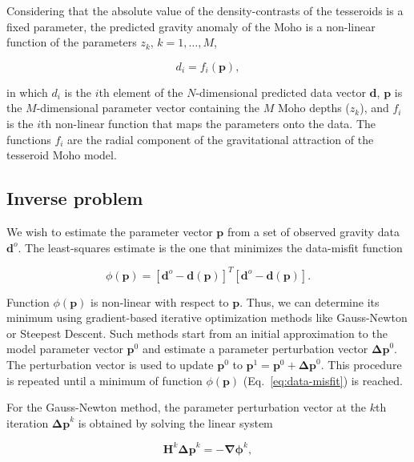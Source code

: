 \documentclass[extra,mreferee]{gji}
\begin{document}
Considering that the absolute value of the density-contrasts
of the tesseroids is a fixed parameter,
the predicted gravity anomaly of the Moho is a non-linear function of the
parameters $z_k$, $k=1, \ldots, M$,

\begin{equation}
    d_i = f_i(\mathbf{p}),
    \label{eq:forward}
\end{equation}

\noindent in which $d_i$ is the $i$th element of the $N$-dimensional predicted
data vector $\mathbf{d}$, $\mathbf{p}$ is the $M$-dimensional parameter vector
containing the $M$ Moho depths ($z_k$),
and $f_i$ is the $i$th non-linear function that maps the parameters onto the
data.
The functions $f_i$ are the radial component of the gravitational attraction
of the tesseroid Moho model.



\subsection{Inverse problem}

We wish to estimate the parameter vector $\mathbf{p}$ from a set of observed
gravity data $\mathbf{d}^o$.
The least-squares estimate is the one that minimizes the data-misfit function

\begin{equation}
    \phi(\mathbf{p}) =
        [\mathbf{d}^o - \mathbf{d}(\mathbf{p})]^T
        [\mathbf{d}^o - \mathbf{d}(\mathbf{p})].
    \label{eq:data-misfit}
\end{equation}

Function $\phi(\mathbf{p})$ is non-linear with respect to $\mathbf{p}$.
Thus, we can determine its minimum using gradient-based
iterative optimization
methods like Gauss-Newton or Steepest Descent.
Such methods start from an initial approximation to the model parameter vector
$\mathbf{p}^0$ and estimate a parameter perturbation vector
$\mathbf{\Delta p}^0$.
The perturbation vector is used to update $\mathbf{p}^0$ to
$\mathbf{p}^1 =  \mathbf{p}^0 + \mathbf{\Delta p}^0$.
This procedure is repeated until a minimum of function $\phi(\mathbf{p})$
(Eq.~\ref{eq:data-misfit}) is reached.

For the Gauss-Newton method,
the parameter perturbation vector at the $k$th iteration $\mathbf{\Delta p}^k$
is obtained by solving the linear system

\begin{equation}
    \mathbf{H}^k\mathbf{\Delta p}^k = -\mathbf{\nabla\phi}^k,
    \label{eq:gaussnewton}
\end{equation}
\end{document}
